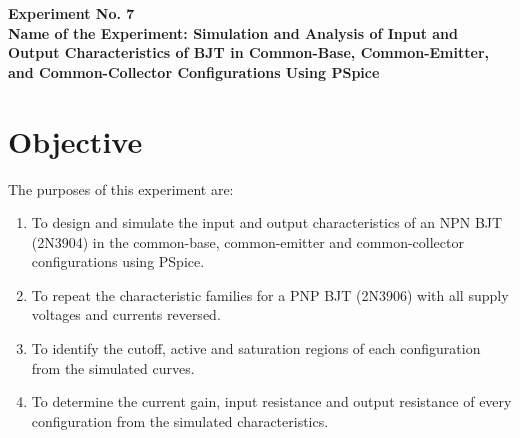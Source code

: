 \documentclass[12pt,a4paper]{article}
\newcommand{\expnumber}{7}
\begin{document}
	
	
	\setcounter{page}{1}

	\begin{center}
		{\large\bfseries Experiment No. \expnumber}\\[4pt]
		{\large\bfseries Name of the Experiment: Simulation and Analysis of
			Input and Output Characteristics of BJT in Common-Base,
			Common-Emitter, and Common-Collector Configurations Using PSpice}
	\end{center}
	\vspace{6pt}

	\section{Objective}
	The purposes of this experiment are:
	\begin{enumerate}[label=\roman*.]
		\item To design and simulate the input and output characteristics of an NPN BJT (2N3904) in the common-base, common-emitter and common-collector configurations using PSpice.
		\item To repeat the characteristic families for a PNP BJT (2N3906) with all supply voltages and currents reversed.
		\item To identify the cutoff, active and saturation regions of each configuration from the simulated curves.
		\item To determine the current gain, input resistance and output resistance of every configuration from the simulated characteristics.
	\end{enumerate}

\end{document}
